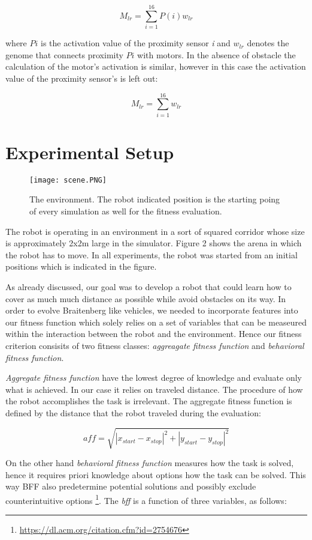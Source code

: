 \documentclass[format=acmsmall, review=false, screen=true]{acmart}
\begin{document}
\[ M_{lr} = \sum_{i=1}^{16} P(i)w_{lr} \]

where \(P{i}\) is the activation value of the proximity sensor \emph{i} and \(w_{lr}\) denotes the genome that connects proximity \(P{i}\) with motors. In the absence of obstacle the calculation of the motor's activation is similar, however in this case the activation value of the proximity sensor's is left out:


\[ M_{lr} = \sum_{i=1}^{16} w_{lr} \]



\section{Experimental Setup}

\begin{figure}[H]
  \texttt{[image: scene.PNG]}
  \caption{The environment. The robot indicated position is the starting poing of every simulation as well for the fitness evaluation.}
  \label{fig:arena-scene}
\end{figure}

The robot is operating in an environment in a sort of squared corridor whose size is approximately 2x2m large in the simulator. Figure 2 shows the arena in which the robot has to move. In all experiments, the robot was started from an initial positions which is indicated in the figure.

As already discussed, our goal was to develop a robot that could learn how to cover as much much distance as possible while avoid obstacles on its way. In order to evolve Braitenberg like vehicles, we needed to incorporate features into our fitness function which solely relies on a set of variables that can be measeured within the interaction between the robot and the environment. Hence our fitness criterion consisits of two fitness classes: \emph{aggreagate fitness function} and \emph{behavioral fitness function}.

\emph{Aggregate fitness function} have the lowest degree of knowledge and evaluate only what is achieved. In our case it relies on traveled distance. The procedure of how the robot accomplishes the task is irrelevant. The aggregate fitness function is defined by the distance that the robot traveled during the evaluation:

\[ aff = \sqrt{|x_{start} - x_{stop}|^2 + |y_{start} - y_{stop}|^2} \]

On the other hand \emph{behavioral fitness function} measures how the task is solved, hence it requires priori knowledge about options how the task can be solved. This way BFF also predetermine potential solutions and possibly exclude counterintuitive options \footnote{\url{https://dl.acm.org/citation.cfm?id=2754676}}. The \emph{bff} is a function of three variables, as follows:
\end{document}
